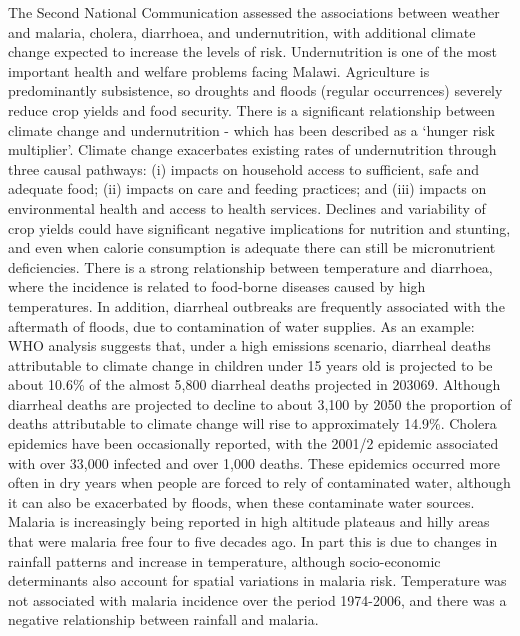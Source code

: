 \documentclass[
]{book}
\begin{document}
The Second National Communication assessed the associations between weather and malaria, cholera, diarrhoea, and undernutrition, with additional climate change expected to increase the levels of risk. Undernutrition is one of the most important health and welfare problems facing Malawi. Agriculture is predominantly subsistence, so droughts and floods (regular occurrences) severely reduce crop yields and food security. There is a significant relationship between climate change and undernutrition - which has been described as a `hunger risk multiplier'. Climate change exacerbates existing rates of undernutrition through three causal pathways: (i) impacts on household access to sufficient, safe and adequate food; (ii) impacts on care and feeding practices; and (iii) impacts on environmental health and access to health services. Declines and variability of crop yields could have significant negative implications for nutrition and stunting, and even when calorie consumption is adequate there can still be micronutrient deficiencies.
There is a strong relationship between temperature and diarrhoea, where the incidence is related to food-borne diseases caused by high temperatures. In addition, diarrheal outbreaks are frequently associated with the aftermath of floods, due to contamination of water supplies. As an example: WHO analysis suggests that, under a high emissions scenario, diarrheal deaths attributable to climate change in children under 15 years old is projected to be about 10.6\% of the almost 5,800 diarrheal deaths projected in 203069. Although diarrheal deaths are projected to decline to about 3,100 by 2050 the proportion of deaths attributable to climate change will rise to approximately 14.9\%. Cholera epidemics have been occasionally reported, with the 2001/2 epidemic associated with over 33,000 infected and over 1,000 deaths. These epidemics occurred more often in dry years when people are forced to rely of contaminated water, although it can also be exacerbated by floods, when these contaminate water sources. Malaria is increasingly being reported in high altitude plateaus and hilly areas that were malaria free four to five decades ago. In part this is due to changes in rainfall patterns and increase in temperature, although socio-economic determinants also account for spatial variations in malaria risk. Temperature was not associated with malaria incidence over the period 1974-2006, and there was a negative relationship between rainfall and malaria.
\end{document}
